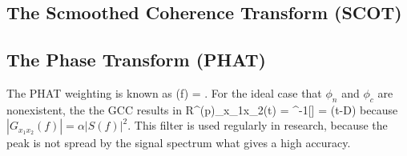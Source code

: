 \subsection{The Scmoothed Coherence Transform (SCOT)}

\subsection{The Phase Transform (PHAT)}
The \ac{PHAT} weighting is known as
\bal
    \Psi(f) = .
\eal
For the ideal case that $\phi_n$ and $\phi_c$ are nonexistent, the the \ac{GCC} results in
\bal
    R^{(p)}_{x_1x_2}(t) = ^{-1}[] = \delta(t-D)
\eal
because $|G_{x_1x_2}(f)| = \alpha |S(f)|^2$.
This filter is used regularly in research, because the peak is not spread by the signal spectrum what gives
a high accuracy.

